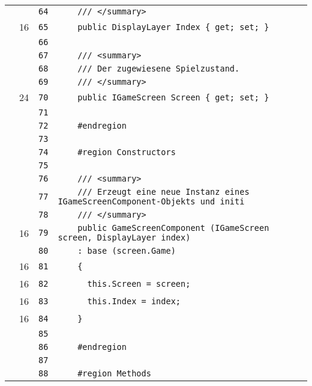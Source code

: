 \documentclass[a4paper,10pt]{article}
\begin{document}
\begin{longtable}[l]{lrrl}
\cellcolor{gray} &  & \verb~64~ & \verb~    /// </summary>~\\
\cellcolor{green} & 16 & \verb~65~ & \verb~    public DisplayLayer Index { get; set; }~\\
\cellcolor{gray} &  & \verb~66~ & \verb~~\\
\cellcolor{gray} &  & \verb~67~ & \verb~    /// <summary>~\\
\cellcolor{gray} &  & \verb~68~ & \verb~    /// Der zugewiesene Spielzustand.~\\
\cellcolor{gray} &  & \verb~69~ & \verb~    /// </summary>~\\
\cellcolor{green} & 24 & \verb~70~ & \verb~    public IGameScreen Screen { get; set; }~\\
\cellcolor{gray} &  & \verb~71~ & \verb~~\\
\cellcolor{gray} &  & \verb~72~ & \verb~    #endregion~\\
\cellcolor{gray} &  & \verb~73~ & \verb~~\\
\cellcolor{gray} &  & \verb~74~ & \verb~    #region Constructors~\\
\cellcolor{gray} &  & \verb~75~ & \verb~~\\
\cellcolor{gray} &  & \verb~76~ & \verb~    /// <summary>~\\
\cellcolor{gray} &  & \verb~77~ & \verb~    /// Erzeugt eine neue Instanz eines IGameScreenComponent-Objekts und initi~\\
\cellcolor{gray} &  & \verb~78~ & \verb~    /// </summary>~\\
\cellcolor{green} & 16 & \verb~79~ & \verb~    public GameScreenComponent (IGameScreen screen, DisplayLayer index)~\\
\cellcolor{gray} &  & \verb~80~ & \verb~    : base (screen.Game)~\\
\cellcolor{green} & 16 & \verb~81~ & \verb~    {~\\
\cellcolor{green} & 16 & \verb~82~ & \verb~      this.Screen = screen;~\\
\cellcolor{green} & 16 & \verb~83~ & \verb~      this.Index = index;~\\
\cellcolor{green} & 16 & \verb~84~ & \verb~    }~\\
\cellcolor{gray} &  & \verb~85~ & \verb~~\\
\cellcolor{gray} &  & \verb~86~ & \verb~    #endregion~\\
\cellcolor{gray} &  & \verb~87~ & \verb~~\\
\cellcolor{gray} &  & \verb~88~ & \verb~    #region Methods~\\

\end{longtable}
\end{document}
